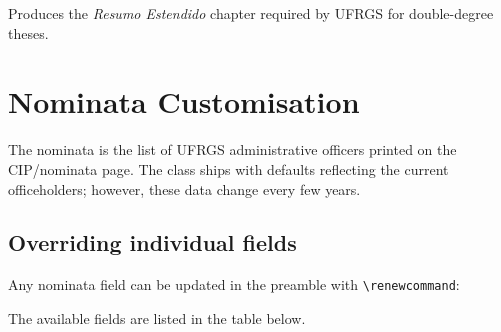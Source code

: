 \documentclass[11pt,a4paper]{article}
\newcommand{\cmd}[1]{\texttt{\textbackslash #1}}
\begin{document}
Produces the \emph{Resumo Estendido} chapter required by UFRGS for
double-degree theses.

\section{Nominata Customisation}
\label{sec:nominata}

The nominata is the list of UFRGS administrative officers printed on
the CIP/nominata page.  The class ships with defaults reflecting the
current officeholders; however, these data change every few years.

\subsection{Overriding individual fields}

Any nominata field can be updated in the preamble with
\cmd{renewcommand}:

\begin{latex}
\renewcommand{\nominataReit}{Prof\textsuperscript{a}.~Ana Silva}
\renewcommand{\nominataReitname}{Reitora}
\end{latex}

The available fields are listed in the table below.
\end{document}
